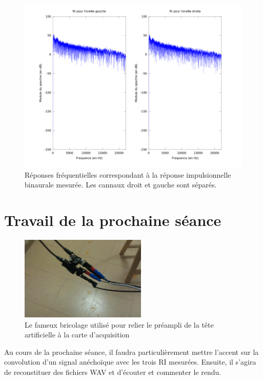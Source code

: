 \documentclass[12pt]{article}
\begin{document}
\begin{figure}[h]
    \vfill\begin{center}
        \includegraphics[scale=0.4]{ri_binaurale.png}
    \end{center}\vfill
    \caption{\label{spectre2} Réponses fréquentielles correspondant à la réponse impulsionnelle binaurale mesurée. Les
    cannaux droit et gauche sont séparés.}
\end{figure}

\section{Travail de la prochaine séance} %

\begin{figure}
    \hfill
    \begin{center}
        \includegraphics[width=6cm]{bidouille.jpg}
        \caption{\label{bidouille}Le fameux bricolage utilisé pour relier le préampli de la tête artificielle à la carte
        d'acquisition}
    \end{center}
    \hfill
\end{figure}
Au cours de la prochaine séance, il faudra particulièrement mettre l'accent sur la convolution d'un signal anéchoïque
avec les trois RI mesurées. Ensuite, il s'agira de reconstituer des fichiers WAV et d'écouter et commenter le rendu.
\end{document}
